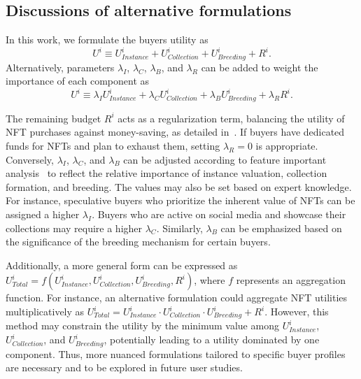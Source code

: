 \documentclass[conference]{IEEEtran}
\newcommand{\1}[1]{\mathds{1}\left[#1\right]}
\theoremstyle{plain}
\newcommand*{\defeq}{\equiv}
\begin{document}
{\subsection{Discussions of alternative formulations}
\label{appsub:alternative}
In this work, we formulate the buyers utility as 
\begin{equation}
    U^i \defeq U^i_\textit{Instance} + U^i_\textit{Collection} + U^i_\textit{Breeding} + R^i.
\end{equation}
Alternatively, parameters $\lambda_{I}$, $\lambda_{C}$, $\lambda_{B}$, and $\lambda_{R}$ can be added to weight the importance of each component as
\begin{equation}
    U^i \defeq \lambda_{I}U^i_\textit{Instance} + \lambda_{C}U^i_\textit{Collection} + \lambda_{B}U^i_\textit{Breeding} + \lambda_{R}R^i.
\end{equation}

The remaining budget $R^i$ acts as a regularization term, balancing the utility of NFT purchases against money-saving, as detailed in~\cite{zhang2022price}. If buyers have dedicated funds for NFTs and plan to exhaust them, setting $\lambda_{R}=0$ is appropriate. Conversely, $\lambda_{I}$, $\lambda_{C}$, and $\lambda_{B}$ can be adjusted according to feature important analysis~\cite{altmann2010permutation, chen2023algorithms} to reflect the relative importance of instance valuation, collection formation, and breeding. The values may also be set based on expert knowledge. For instance, speculative buyers who prioritize the inherent value of NFTs can be assigned a higher $\lambda_{I}$. Buyers who are active on social media and showcase their collections may require a higher $\lambda_{C}$. Similarly, $\lambda_{B}$ can be emphasized based on the significance of the breeding mechanism for certain buyers.

Additionally, a more general form can be expressed as $U^i_\textit{Total} = f(U^i_\textit{Instance}, U^i_\textit{Collection}, U^i_\textit{Breeding}, R^i)$, where $f$ represents an aggregation function. For instance, an alternative formulation could aggregate NFT utilities multiplicatively as $U^i_\textit{Total} = U^i_\textit{Instance} \cdot U^i_\textit{Collection} \cdot U^i_\textit{Breeding} + R^i$. However, this method may constrain the utility by the minimum value among $U^i_\textit{Instance}$, $U^i_\textit{Collection}$, and $U^i_\textit{Breeding}$, potentially leading to a utility dominated by one component. Thus, more nuanced formulations tailored to specific buyer profiles are necessary and to be explored in future user studies.

}
\end{document}
